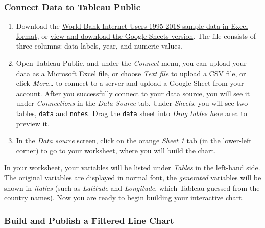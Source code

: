 \documentclass[
  english,
]{book}
\begin{document}
\hypertarget{connect-data-to-tableau-public}{%
\subsubsection*{Connect Data to Tableau Public}\label{connect-data-to-tableau-public}}

\begin{enumerate}
\def\labelenumi{\arabic{enumi}.}
\item
  Download the \href{data/world-bank-internet-users-1995-2018.xlsx}{World Bank Internet Users 1995-2018 sample data in Excel format}, or \href{https://docs.google.com/spreadsheets/d/1nrfd8Cr-wpm5N9WGA2YO6d1XLuwk-VK8kCvDwoTdeWM/edit\#gid=600173793}{view and download the Google Sheets version}. The file consists of three columns: data labels, year, and numeric values.
\item
  Open Tableau Public, and under the \emph{Connect} menu, you can upload your data as a Microsoft Excel file, or choose \emph{Text file} to upload a CSV file, or click \emph{More\ldots{}} to connect to a server and upload a Google Sheet from your account. After you successfully connect to your data source, you will see it under \emph{Connections} in the \emph{Data Source} tab. Under \emph{Sheets}, you will see two tables, \texttt{data} and \texttt{notes}. Drag the \texttt{data} sheet into \emph{Drag tables here} area to preview it.
\item
  In the \emph{Data source} screen, click on the orange \emph{Sheet 1} tab (in the lower-left corner) to go to your worksheet, where you will build the chart.
\end{enumerate}

In your worksheet, your variables will be listed under \emph{Tables} in the left-hand side. The original variables are displayed in normal font, the \emph{generated} variables will be shown in \emph{italics} (such as \emph{Latitude} and \emph{Longitude}, which Tableau guessed from the country names). Now you are ready to begin building your interactive chart.

\hypertarget{build-and-publish-a-filtered-line-chart}{%
\subsubsection*{Build and Publish a Filtered Line Chart}\label{build-and-publish-a-filtered-line-chart}}
\end{document}
